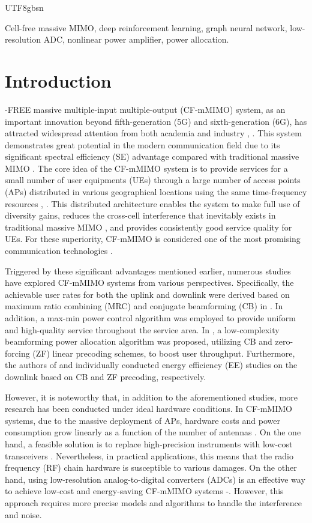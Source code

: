 \documentclass[lettersize,journal]{IEEEtran}
\begin{document}
\begin{CJK}{UTF8}{gbsn}
\begin{IEEEkeywords}
Cell-free massive MIMO, deep reinforcement learning, graph neural network, low-resolution ADC, nonlinear power amplifier, power allocation.
\end{IEEEkeywords}


\section{Introduction}
-FREE massive multiple-input multiple-output (CF-mMIMO) system, as an important innovation beyond fifth-generation (5G) and sixth-generation (6G), has attracted widespread attention from both academia and industry \cite{paperI1}, \cite{paperI2}. This system demonstrates great potential in the modern communication field due to its significant spectral efficiency (SE) advantage compared with traditional massive MIMO \cite{paperI3}. The core idea of the CF-mMIMO system is to provide services for a small number of user equipments (UEs) through a large number of access points (APs) distributed in various geographical locations using the same time-frequency resources \cite{paperI4}, \cite{paperI5}. This distributed architecture enables the system to make full use of diversity gains, reduces the cross-cell interference that inevitably exists in traditional massive MIMO \cite{paperI6}, and provides consistently good service quality for UEs. For these superiority, CF-mMIMO is considered one of the most promising communication technologies \cite{paperI7}.

Triggered by these significant advantages mentioned earlier, numerous studies have explored CF-mMIMO systems from various perspectives. Specifically, the achievable user rates for both the uplink and downlink were derived based on maximum ratio combining (MRC) and conjugate beamforming (CB) in \cite{paperI3}. In addition, a max-min power control algorithm was employed to provide uniform and high-quality service throughout the service area. In \cite{paperI8}, a low-complexity beamforming power allocation algorithm was proposed, utilizing CB and zero-forcing (ZF) linear precoding schemes, to boost user throughput. Furthermore, the authors of \cite{paperI7} and \cite{paperI9} individually conducted energy efficiency (EE) studies on the downlink based on CB and ZF precoding, respectively. 

However, it is noteworthy that, in addition to the aforementioned studies, more research has been conducted under ideal hardware conditions. In CF-mMIMO systems, due to the massive deployment of APs, hardware costs and power consumption grow linearly as a function of the number of antennas \cite{paperIA15}. On the one hand, a feasible solution is to replace high-precision instruments with low-cost transceivers \cite{paperI10}. Nevertheless, in practical applications, this means that the radio frequency (RF) chain hardware is susceptible to various damages. On the other hand, using low-resolution analog-to-digital converters (ADCs) is an effective way to achieve low-cost and energy-saving CF-mMIMO systems \cite{paperI11}-\cite{paperI13}. However, this approach requires more precise models and algorithms to handle the interference and noise.


\end{CJK}
\end{document}
